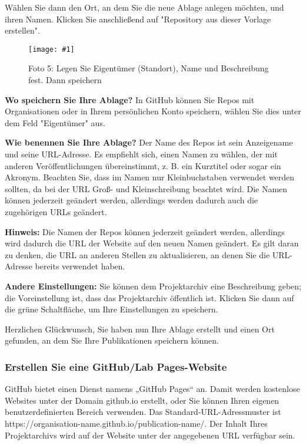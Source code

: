 \documentclass{article}
\newlength{\imgwidth}
\newcommand\scaledgraphics[2]{%
                
\settowidth{\imgwidth}{\texttt{[image: \#1]}}%
                
\setlength{\imgwidth}{\minof{\imgwidth}{#2\textwidth}}%
                
\texttt{[image: \#1]}%
                
}
\begin{document}
Wählen Sie dann den Ort, an dem Sie die neue Ablage anlegen möchten, und ihren Namen. Klicken Sie anschließend auf "Repository aus dieser Vorlage erstellen".

\begin{figure}
\scaledgraphics{e61a310c-a521-4f60-81ba-bdfacba7ef99.png}{1}
\caption*{Foto 5: Legen Sie Eigentümer (Standort), Name und Beschreibung fest. Dann speichern}\label{F59276791}
\end{figure}


\textbf{Wo speichern Sie Ihre Ablage?} In GitHub können Sie Repos mit Organisationen oder in Ihrem persönlichen Konto speichern, wählen Sie dies unter dem Feld "Eigentümer" aus.


\textbf{Wie benennen Sie Ihre Ablage?} Der Name des Repos ist sein Anzeigename und seine URL-Adresse. Es empfiehlt sich, einen Namen zu wählen, der mit anderen Veröffentlichungen übereinstimmt, z. B. ein Kurztitel oder sogar ein Akronym. Beachten Sie, dass im Namen nur Kleinbuchstaben verwendet werden sollten, da bei der URL Groß- und Kleinschreibung beachtet wird. Die Namen können jederzeit geändert werden, allerdings werden dadurch auch die zugehörigen URLs geändert.


\textbf{Hinweis:} Die Namen der Repos können jederzeit geändert werden, allerdings wird dadurch die URL der Website auf den neuen Namen geändert. Es gilt daran zu denken, die URL an anderen Stellen zu aktualisieren, an denen Sie die URL-Adresse bereits verwendet haben.


\textbf{Andere Einstellungen:} Sie können dem Projektarchiv eine Beschreibung geben; die Voreinstellung ist, dass das Projektarchiv öffentlich ist. Klicken Sie dann auf die grüne Schaltfläche, um Ihre Einstellungen zu speichern.


Herzlichen Glückwunsch, Sie haben nun Ihre Ablage erstellt und einen Ort gefunden, an dem Sie Ihre Publikationen speichern können.


\subsubsection{Erstellen Sie eine GitHub/Lab Pages-Website}\label{H3055126}



GitHub bietet einen Dienst namens „GitHub Pages“ an. Damit werden kostenlose Websites unter der Domain github.io erstellt, oder Sie können Ihren eigenen benutzerdefinierten Bereich verwenden. Das Standard-URL-Adressmuster ist https://organisation-name.github.io/publication-name/. Der Inhalt Ihres Projektarchivs wird auf der Website unter der angegebenen URL verfügbar sein.
\end{document}
